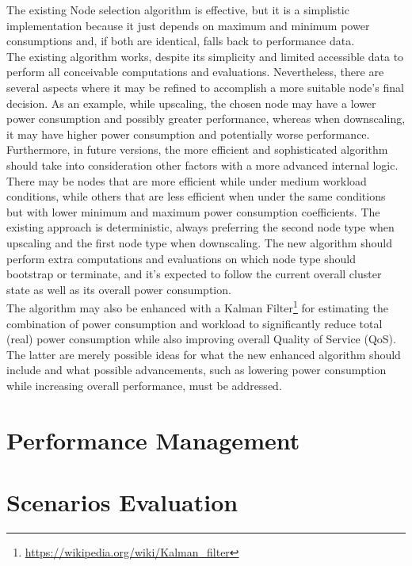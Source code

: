 The existing Node selection algorithm is effective, but it is a simplistic implementation
because it just depends on maximum and minimum power consumptions and, if both
are identical, falls back to performance data. \\ %
The existing algorithm works, despite its simplicity and limited accessible data
to perform all conceivable computations and evaluations. Nevertheless, there are
several aspects where it may be refined to accomplish a more suitable node's
final decision. As an example, while upscaling, the chosen node may have a lower
power consumption and possibly greater performance, whereas when downscaling, it
may have higher power consumption and potentially worse performance. Furthermore,
in future versions, the more efficient and sophisticated algorithm should take
into consideration other factors with a more advanced internal logic. There may be
nodes that are more efficient while under medium workload conditions, while
others that are less efficient when under the same conditions but with lower
minimum and maximum power consumption coefficients. The existing approach is deterministic,
always preferring the second node type when upscaling and the first node type
when downscaling. The new algorithm should perform extra computations and evaluations
on which node type should bootstrap or terminate, and it's expected to follow
the current overall cluster state as well as its overall power consumption. \\ %
The algorithm may also be enhanced with a Kalman Filter\footnote{\url{https://wikipedia.org/wiki/Kalman_filter}}
for estimating the combination of power consumption and workload to
significantly reduce total (real) power consumption while also improving overall
Quality of Service (QoS). \\ %
The latter are merely possible ideas for what the new enhanced algorithm should
include and what possible advancements, such as lowering power consumption while
increasing overall performance, must be addressed.

\section{Performance Management}
\label{subsec:conclusions_limitations_and_future_works_performance_management}

\section{Scenarios Evaluation}
\label{subsec:conclusions_limitations_and_future_works_scenarios_evaluation}

